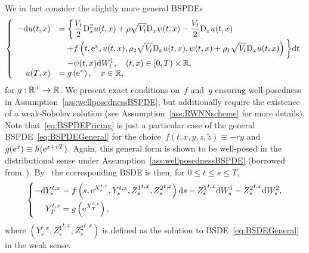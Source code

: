 We in fact consider the slightly more general BSPDEs
\begin{equation}\label{eq:BSPDEGeneral}
\left\{\begin{array}{rl}
-\mathrm{d} u(t,x) &= \displaystyle \bigg\{\frac{V_{t}}{2} \mathrm{D}_{x}^{2} u(t,x)+\rho \sqrt{V_{t}} \mathrm{D}_{x} \psi(t,x)-\frac{V_{t}}{2} \mathrm{D}_{x} u(t,x) \\
& \quad \displaystyle + f\left(t, \mathrm{e}^{x}, u(t,x), \rho_2\sqrt{V_{t}} \mathrm{D}_{x} u(t,x), \psi(t,x)+ \rho_1 \sqrt{V_{t}} \mathrm{D}_{x} u(t,x)\right)\bigg\} \mathrm{d} t \\
& \quad \displaystyle -\psi(t,x) \mathrm{d} W^1_{t}, \quad(t, x) \in[0, T) \times \mathbb{R}, \\
u(T,x) &= \displaystyle g \left(\mathrm{e}^{x}\right), \quad x \in \mathbb{R},
\end{array}\right.
\end{equation}
for $g:\mathbb{R}^+\rightarrow \mathbb{R}$. We present exact conditions on~$f$ and~$g$ ensuring well-posedness in Assumption~\ref{ass:wellposednessBSPDE},
but additionally require the existence of a weak-Sobolev solution (see Assumption~\ref{ass:RWNNscheme} for more details). 
Note that~\eqref{eq:BSPDEPricing} is just a particular case of the general BSPDE~\eqref{eq:BSPDEGeneral} for the choice~${f(t, x, y, z, \widetilde{z}) \equiv -ry}$ and~${g(\mathrm{e}^{x})\equiv h(\mathrm{e}^{x+rT})}$. 
Again, this general form is shown to be well-posed in the distributional sense under Assumption~\ref{ass:wellposednessBSPDE} (borrowed from~\cite{Bayer2022PricingSPDEs}). 
By~\cite{Briand2003LpEquations} the corresponding BSDE is then,
for $0 \leq t \leq s \leq T$,
\begin{equation}\label{eq:BSDEGeneral}
\left\{\begin{aligned}
-\mathrm{d} Y_{s}^{t, x} &=f\left(s, \mathrm{e}^{X_{s}^{t, x}}, Y_{s}^{t, x}, {Z_{s}^{1}}^{t, x}, {Z_{s}^{2}}^{t, x}\right) \mathrm{d} s - {Z_{s}^{1}}^{t, x} \mathrm{d} W^1_{s} - {Z_{s}^{2}}^{t, x} \mathrm{d} W^2_{s},\\
Y_{T}^{t, x} &=g\left(\mathrm{e}^{X_{T}^{t, x}}\right),
\end{aligned}\right.
\end{equation}
where $(Y_{s}^{t, x}, {Z_{s}^{1}}^{t, x}, {Z_{s}^{2}}^{t, x})$ is defined as the solution to BSDE~\eqref{eq:BSDEGeneral} in the weak sense. 


